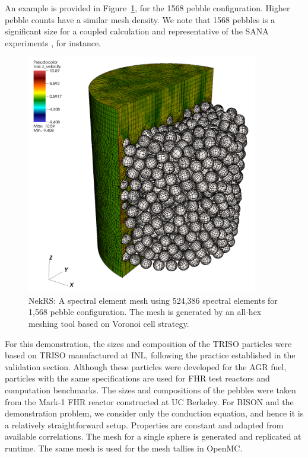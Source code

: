 An example is provided in Figure~\ref{f:ndemo1}, for the 1568
pebble configuration. Higher pebble counts have a similar mesh density.
We note that 1568 pebbles is a significant size for a coupled calculation and
representative of the SANA experiments \cite{zou2017validation}, for instance.

\begin{figure}[!h]
\centering
\includegraphics[clip=true,width=0.9\textwidth]{Figures/ndemo_r1}
\caption{NekRS: A spectral element mesh using 524,386 spectral elements for 1,568 pebble configuration.
         The mesh is generated by an all-hex meshing tool based on Voronoi cell strategy.}
\label{f:ndemo1}
\end{figure}

For this demonstration, the sizes and composition of the TRISO particles were based on TRISO manufactured at INL, following the practice established in the validation section. Although these particles were developed for the AGR fuel, particles with the same specifications are used for FHR test reactors and computation benchmarks. The sizes and compositions of the pebbles were taken from the Mark-1 FHR reactor constructed at UC Berkeley. For BISON and the demonstration problem, we consider only the conduction equation, and hence  it is a relatively straightforward setup. Properties are constant and adapted from available correlations. The mesh for a single sphere is generated and replicated at runtime. The same mesh is used for the mesh tallies in OpenMC.

